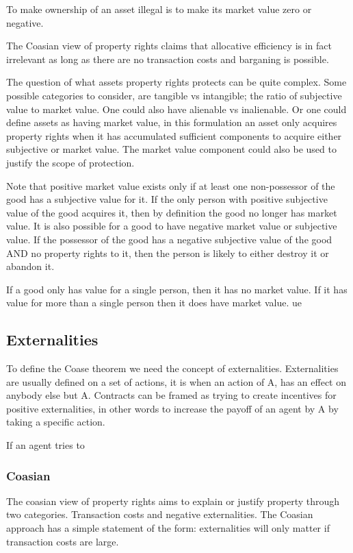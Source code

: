 \documentclass[12pt]{article}
\numberwithin{equation}{section}
\begin{document}
To make ownership of an asset illegal is to make its market value zero or negative. 

The Coasian view of property rights claims that allocative efficiency is in fact irrelevant as long as there are no transaction costs and barganing is possible. 

The question of what assets property rights protects can be quite complex. Some possible categories to consider, are tangible vs intangible; the ratio of subjective value to market value. One could also have alienable vs inalienable. Or one could define assets as having market value, in this formulation an asset only acquires property rights when it has accumulated sufficient components to acquire either subjective or market value. The market value component could also be used to justify the scope of protection. 

Note that positive market value exists only if at least one non-possessor of the good has a subjective value for it. If the only person with positive subjective value of the good acquires it, then by definition the good no longer has market value. It is also possible for a good to have negative market value or subjective value. If the possessor of the good has a negative subjective value of the good AND no property rights to it, then the person is likely to either destroy it or abandon it. 

If a good only has value for a single person, then it has no market value. If it has value for more than a single person then it does have market value. ue 

\subsection{Externalities}

To define the Coase theorem we need the concept of externalities. Externalities are usually defined on a set of actions, it is when an action of A, has an effect on anybody else but A. Contracts can be framed as trying to create incentives for positive externalities, in other words to increase the payoff of an agent by A by taking a specific action.  

If an agent tries to 

\subsubsection{Coasian}




The coasian view of property rights aims to explain or justify property through two categories. Transaction costs and negative externalities. The Coasian approach has a simple statement of the form: externalities will only matter if transaction costs are large. 
\end{document}
